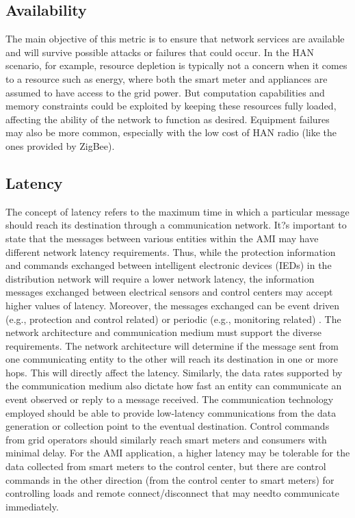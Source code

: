 \documentclass[11pt,draftclsnofoot,onecolumn]{IEEEtran}
\begin{document}
\subsection{Availability}

The main objective of this metric is to ensure that network services are available and will survive possible attacks or failures that could occur. In the HAN scenario, for example, resource depletion is typically not a concern when it comes to a resource such as energy, where both the smart meter and appliances are assumed to have access to the grid power. But computation capabilities and memory constraints could be exploited by keeping these resources fully loaded, affecting the ability of the network to function as desired. Equipment failures may also be more common, especially with the low cost of HAN radio (like the ones provided by ZigBee).

\subsection{Latency}
The concept of latency refers to the maximum time in which a particular message should reach its destination through a communication network. It?s important to state that the messages between various entities within the AMI may have different network latency requirements. Thus, while the protection information and commands exchanged between intelligent electronic devices (IEDs) in the distribution network will require a lower network latency, the information messages exchanged between electrical sensors and control centers may accept higher values of latency.  Moreover, the messages exchanged can be event driven (e.g., protection and control related) or periodic (e.g., monitoring related) \cite{Winter2012}. The network architecture and communication medium must support the diverse requirements. The network architecture will determine if the message sent from one communicating entity to the other will reach its destination in one or more hops. This will directly affect the latency. Similarly, the data rates supported by the communication medium also dictate how fast an entity can communicate an event observed or reply to a message received.  The communication technology employed should be able to provide low-latency communications from the data generation or collection point to the eventual destination. Control commands from grid operators should similarly reach smart meters and consumers with minimal delay. For the AMI application, a higher latency may be tolerable for the data collected from smart meters to the control center, but there are control commands in the other direction (from the control center to smart meters) for controlling loads and remote connect/disconnect that may needto communicate immediately.
\end{document}
